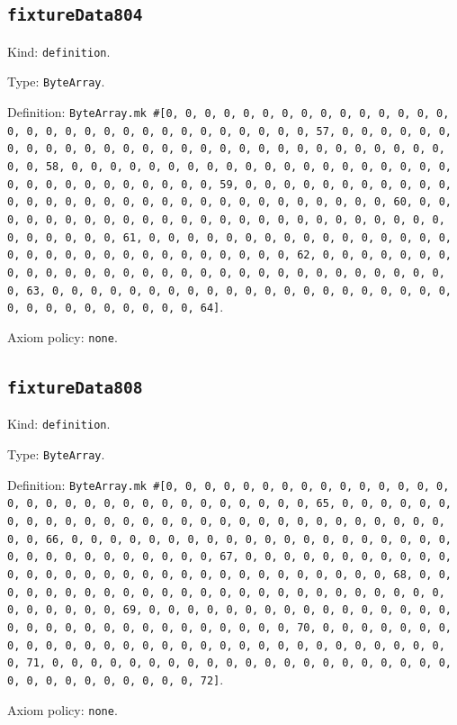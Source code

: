 \documentclass[11pt]{article}
\begin{document}
\subsection*{\texttt{fixtureData804}}
\noindent Kind: \texttt{definition}.\par
\noindent Type: \texttt{ByteArray}.\par
\noindent Definition: \texttt{ByteArray.mk \#[0, 0, 0, 0, 0, 0, 0, 0, 0, 0, 0, 0, 0, 0, 0, 0, 0, 0, 0, 0, 0, 0, 0, 0, 0, 0, 0, 0, 0, 0, 0, 57, 0, 0, 0, 0, 0, 0, 0, 0, 0, 0, 0, 0, 0, 0, 0, 0, 0, 0, 0, 0, 0, 0, 0, 0, 0, 0, 0, 0, 0, 0, 0, 58, 0, 0, 0, 0, 0, 0, 0, 0, 0, 0, 0, 0, 0, 0, 0, 0, 0, 0, 0, 0, 0, 0, 0, 0, 0, 0, 0, 0, 0, 0, 0, 59, 0, 0, 0, 0, 0, 0, 0, 0, 0, 0, 0, 0, 0, 0, 0, 0, 0, 0, 0, 0, 0, 0, 0, 0, 0, 0, 0, 0, 0, 0, 0, 60, 0, 0, 0, 0, 0, 0, 0, 0, 0, 0, 0, 0, 0, 0, 0, 0, 0, 0, 0, 0, 0, 0, 0, 0, 0, 0, 0, 0, 0, 0, 0, 61, 0, 0, 0, 0, 0, 0, 0, 0, 0, 0, 0, 0, 0, 0, 0, 0, 0, 0, 0, 0, 0, 0, 0, 0, 0, 0, 0, 0, 0, 0, 0, 62, 0, 0, 0, 0, 0, 0, 0, 0, 0, 0, 0, 0, 0, 0, 0, 0, 0, 0, 0, 0, 0, 0, 0, 0, 0, 0, 0, 0, 0, 0, 0, 63, 0, 0, 0, 0, 0, 0, 0, 0, 0, 0, 0, 0, 0, 0, 0, 0, 0, 0, 0, 0, 0, 0, 0, 0, 0, 0, 0, 0, 0, 0, 0, 64]}.\par
\noindent Axiom policy: \texttt{none}.\par
\subsection*{\texttt{fixtureData808}}
\noindent Kind: \texttt{definition}.\par
\noindent Type: \texttt{ByteArray}.\par
\noindent Definition: \texttt{ByteArray.mk \#[0, 0, 0, 0, 0, 0, 0, 0, 0, 0, 0, 0, 0, 0, 0, 0, 0, 0, 0, 0, 0, 0, 0, 0, 0, 0, 0, 0, 0, 0, 0, 65, 0, 0, 0, 0, 0, 0, 0, 0, 0, 0, 0, 0, 0, 0, 0, 0, 0, 0, 0, 0, 0, 0, 0, 0, 0, 0, 0, 0, 0, 0, 0, 66, 0, 0, 0, 0, 0, 0, 0, 0, 0, 0, 0, 0, 0, 0, 0, 0, 0, 0, 0, 0, 0, 0, 0, 0, 0, 0, 0, 0, 0, 0, 0, 67, 0, 0, 0, 0, 0, 0, 0, 0, 0, 0, 0, 0, 0, 0, 0, 0, 0, 0, 0, 0, 0, 0, 0, 0, 0, 0, 0, 0, 0, 0, 0, 68, 0, 0, 0, 0, 0, 0, 0, 0, 0, 0, 0, 0, 0, 0, 0, 0, 0, 0, 0, 0, 0, 0, 0, 0, 0, 0, 0, 0, 0, 0, 0, 69, 0, 0, 0, 0, 0, 0, 0, 0, 0, 0, 0, 0, 0, 0, 0, 0, 0, 0, 0, 0, 0, 0, 0, 0, 0, 0, 0, 0, 0, 0, 0, 70, 0, 0, 0, 0, 0, 0, 0, 0, 0, 0, 0, 0, 0, 0, 0, 0, 0, 0, 0, 0, 0, 0, 0, 0, 0, 0, 0, 0, 0, 0, 0, 71, 0, 0, 0, 0, 0, 0, 0, 0, 0, 0, 0, 0, 0, 0, 0, 0, 0, 0, 0, 0, 0, 0, 0, 0, 0, 0, 0, 0, 0, 0, 0, 72]}.\par
\noindent Axiom policy: \texttt{none}.\par
\end{document}
